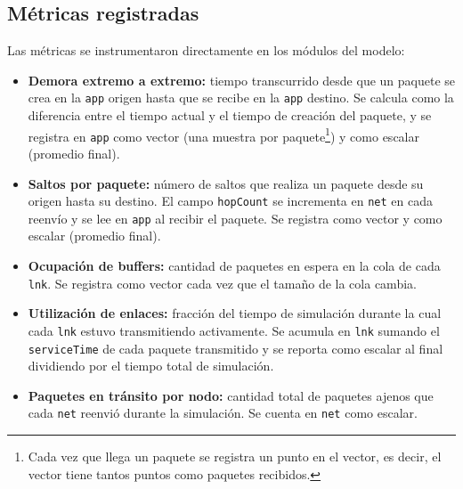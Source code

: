 \documentclass[10pt,letterpaper,twocolumn]{article}
\newcommand{\coltablesetup}{%
  \scriptsize
  \setlength{\tabcolsep}{3pt}%
  \renewcommand{\arraystretch}{1.08}%
}
\begin{document}
\FloatBarrier

\subsection{Métricas registradas}
\label{sec:metricas}

Las métricas se instrumentaron directamente en los módulos del modelo:

\begin{itemize}
  \item \textbf{Demora extremo a extremo:} tiempo transcurrido desde que un paquete se crea en la \texttt{app} origen hasta que se recibe en la \texttt{app} destino. Se calcula como la diferencia entre el tiempo actual y el tiempo de creación del paquete, y se registra en \texttt{app} como vector (una muestra por paquete\footnote{Cada vez que llega un paquete se registra un punto en el vector, es decir, el vector tiene tantos puntos como paquetes recibidos.}) y como escalar (promedio final).
  \item \textbf{Saltos por paquete:} número de saltos que realiza un paquete desde su origen hasta su destino. El campo \texttt{hopCount} se incrementa en \texttt{net} en cada reenvío y se lee en \texttt{app} al recibir el paquete. Se registra como vector y como escalar (promedio final).
  \item \textbf{Ocupación de buffers:} cantidad de paquetes en espera en la cola de cada \texttt{lnk}. Se registra como vector cada vez que el tamaño de la cola cambia.
  \item \textbf{Utilización de enlaces:} fracción del tiempo de simulación durante la cual cada \texttt{lnk} estuvo transmitiendo activamente. Se acumula en \texttt{lnk} sumando el \texttt{serviceTime} de cada paquete transmitido y se reporta como escalar al final dividiendo por el tiempo total de simulación.
  \item \textbf{Paquetes en tránsito por nodo:} cantidad total de paquetes ajenos que cada \texttt{net} reenvió durante la simulación. Se cuenta en \texttt{net} como escalar.
\end{itemize}

\begin{table}[!ht]
  \centering
  \caption{Métricas instrumentadas en el simulador.}
  \label{tab:metricas}
  \coltablesetup
\end{table}
\end{document}
